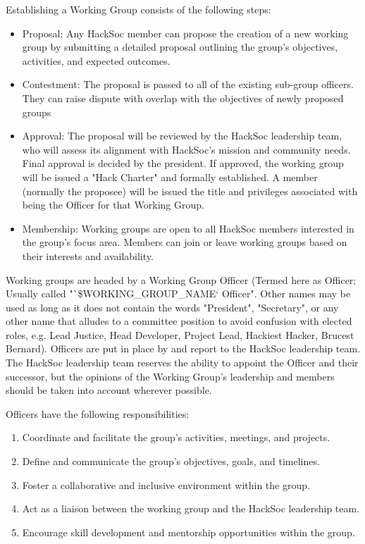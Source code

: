 \begin{clause}
    Establishing a Working Group consists of the following steps:
    \begin{itemize}
        \item Proposal: Any HackSoc member can propose the creation of a new working group by submitting a detailed proposal outlining the group's objectives, activities, and expected outcomes.
        \item Contestment: The proposal is passed to all of the existing sub-group officers. They can raise dispute with overlap with the objectives of newly proposed groups
        \item Approval: The proposal will be reviewed by the HackSoc leadership team, who will assess its alignment with HackSoc's mission and community needs. Final approval is decided by the president. If approved, the working group will be issued a "Hack Charter" and formally established. A member (normally the proposee) will be issued the title and privileges associated with being the Officer for that Working Group.
        \item Membership: Working groups are open to all HackSoc members interested in the group's focus area. Members can join or leave working groups based on their interests and availability.
    \end{itemize}
\end{clause}

\begin{clause}
    Working groups are headed by a Working Group Officer (Termed here as Officer; Usually called "`\$WORKING_GROUP_NAME` Officer". Other names may be used as long as it does not contain the words "President", "Secretary", or any other name that alludes to a committee position to avoid confusion with elected roles, e.g. Lead Justice, Head Developer, Project Lead, Hackiest Hacker, Brucest Bernard). Officers are put in place by and report to the HackSoc leadership team. The HackSoc leadership team reserves the ability to appoint the Officer and their successor, but the opinions of the Working Group's leadership and members should be taken into account wherever possible.
\end{clause}

\begin{subclause}
    Officers have the following responsibilities:
    \begin{enumerate}
        \item Coordinate and facilitate the group's activities, meetings, and projects.
        \item Define and communicate the group's objectives, goals, and timelines.
        \item Foster a collaborative and inclusive environment within the group.
        \item Act as a liaison between the working group and the HackSoc leadership team.
        \item Encourage skill development and mentorship opportunities within the group.
    \end{enumerate}
\end{subclause}

